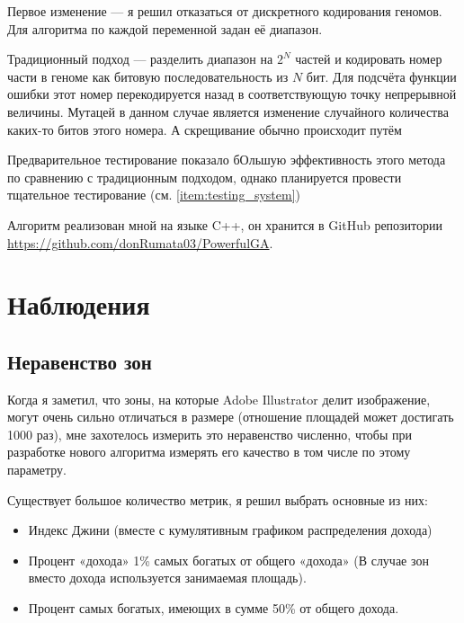 \documentclass[11pt]{article}
\begin{document}
    Первое изменение — я решил отказаться от дискретного кодирования геномов.
    Для алгоритма по каждой переменной задан её диапазон.

    Традиционный подход — разделить диапазон на $2^N$ частей и кодировать номер части в геноме как битовую последовательность из $N$ бит.
    Для подсчёта функции ошибки этот номер перекодируется назад в соответствующую точку непрерывной величины.
    Мутацей в данном случае является изменение случайного количества каких-то битов этого номера.
    А скрещивание обычно происходит путём

    Предварительное тестирование показало бОльшую эффективность этого метода по сравнению с традиционным подходом, однако планируется провести тщательное тестирование (см. \ref{item:testing_system})

    Алгоритм реализован мной на языке C++, он хранится в GitHub репозитории \href{https://github.com/donRumata03/PowerfulGA}{https://github.com/donRumata03/PowerfulGA}.

    \section{Наблюдения}\label{sec:observations}

    \subsection{Неравенство зон}\label{subsec:inequality}
    Когда я заметил, что зоны, на которые Adobe Illustrator делит изображение, могут очень сильно отличаться в размере (отношение площадей может достигать 1000 раз),
    мне захотелось измерить это неравенство численно, чтобы при разработке нового алгоритма измерять его качество в том числе по этому параметру.

    Существует большое количество метрик, я решил выбрать основные из них:
    \begin{itemize}
        \item Индекс Джини (вместе с кумулятивным графиком распределения дохода)
        \item Процент «дохода» 1\% самых богатых от общего «дохода» (В случае зон вместо дохода используется занимаемая площадь).
        \item Процент самых богатых, имеющих в сумме 50\% от общего дохода.
    \end{itemize}
\end{document}
